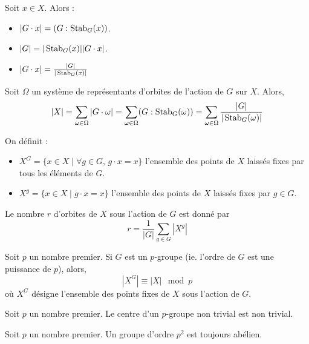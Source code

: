	
	\begin{proposition}
		Soit $x \in X$. Alors :
		\begin{itemize}
			\item $|G \cdot x| = (G : \operatorname{Stab}_G(x))$.
			\item $|G| = |\operatorname{Stab}_G(x)| |G \cdot x|$.
			\item $|G \cdot x| = \frac{|G|}{|\operatorname{Stab}_G(x)|}$
		\end{itemize}
	\end{proposition}
	
	\begin{theorem}
		Soit $\Omega$ un système de représentants d'orbites de l'action de $G$ sur $X$. Alors,
		\[ |X| = \sum_{\omega \in \Omega} |G \cdot \omega| = \sum_{\omega \in \Omega} (G : \operatorname{Stab}_G(\omega)) = \sum_{\omega \in \Omega} \frac{|G|}{|\operatorname{Stab}_G(\omega)|} \]
	\end{theorem}
	
	\begin{definition}
		On définit :
		\begin{itemize}
			\item $X^G = \{ x \in X \mid \forall g \in G, \, g \cdot x = x \}$ l'ensemble des points de $X$ laissés fixes par tous les éléments de $G$.
			\item $X^g = \{ x \in X \mid g \cdot x = x \}$ l'ensemble des points de $X$ laissés fixes par $g \in G$.
		\end{itemize}
	\end{definition}
	
	\begin{theorem}
		Le nombre $r$ d'orbites de $X$ sous l'action de $G$ est donné par
		\[ r = \frac{1}{|G|} \sum_{g \in G} |X^g| \]
	\end{theorem}
	
	\begin{corollary}
		Soit $p$ un nombre premier. Si $G$ est un $p$-groupe (ie. l'ordre de $G$ est une puissance de $p$), alors,
		\[ |X^G| \equiv |X| \mod p \]
		où $X^G$ désigne l'ensemble des points fixes de $X$ sous l'action de $G$.
	\end{corollary}
	
	\begin{corollary}
		Soit $p$ un nombre premier. Le centre d'un $p$-groupe non trivial est non trivial.
	\end{corollary}
	
	\begin{corollary}
		Soit $p$ un nombre premier. Un groupe d'ordre $p^2$ est toujours abélien.
	\end{corollary}
	
